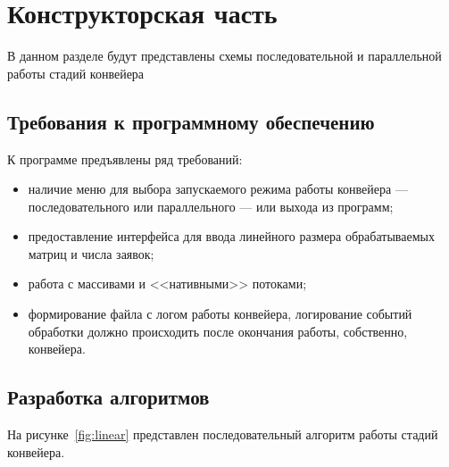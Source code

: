 \chapter{Конструкторская часть}

В данном разделе будут представлены схемы последовательной и параллельной работы стадий конвейера

\section{Требования к программному обеспечению}

К программе предъявлены ряд требований:

\begin{itemize}[label=---]
	\item наличие меню для выбора запускаемого режима работы конвейера --- последовательного или параллельного — или выхода из программ;
	\item предоставление интерфейса для ввода линейного размера обрабатываемых матриц и числа заявок;
	\item работа с массивами и <<нативными>> потоками;
	\item формирование файла с логом работы конвейера, логирование событий обработки должно происходить после окончания работы, собственно, конвейера.
\end{itemize}

\section{Разработка алгоритмов}

На рисунке~\ref{fig:linear} представлен последовательный алгоритм работы стадий конвейера.

